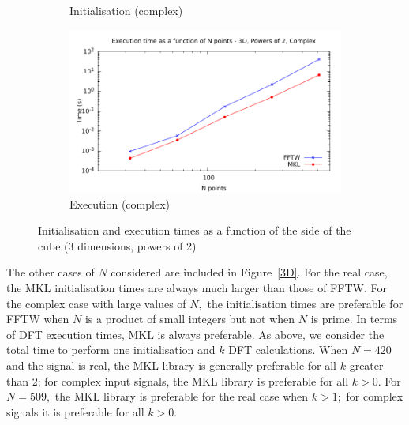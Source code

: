 \documentclass[12pt, a4paper]{article} \setlength{\textheight}{24cm}
\begin{document}
\begin{figure}[H]
\begin{subfigure}{.5\textwidth}
    \caption{Initialisation (complex)}
    \label{3DPOW2CI}
  \end{subfigure}%
  \begin{subfigure}{.5\textwidth}
    \centering
    \includegraphics[width=.9\linewidth]{graphs/3d-pow2-exec-c.pdf}
    \caption{Execution (complex)}
    \label{3DPOW2C}
  \end{subfigure}
  \caption{Initialisation and execution times as a function of the
    side of the cube (3 dimensions, powers of 2)}
  \label{3DPOW2}
\end{figure}

The other cases of $N$ considered are included in Figure~\ref{3D}. For
the real case, the MKL initialisation times are always much larger
than those of FFTW. For the complex case with large values of $N,$ the
initialisation times are preferable for FFTW when $N$ is a product of
small integers but not when $N$ is prime. In terms of DFT execution
times, MKL is always preferable. As above, we consider the total time
to perform one initialisation and $k$ DFT calculations. When $N=420$
and the signal is real, the MKL library is generally preferable for
all $k$ greater than 2; for complex input signals, the MKL library is
preferable for all $k>0.$ For $N=509,$ the MKL library is preferable
for the real case when $k>1;$ for complex signals it is preferable for
all $k>0.$
\end{document}
